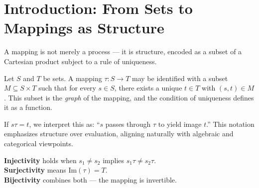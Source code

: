 \documentclass[10pt]{article}
\begin{document}
\section*{Introduction: From Sets to Mappings as Structure}

A mapping is not merely a process — it is structure, encoded as a subset of a Cartesian product subject to a rule of uniqueness.

Let \( S \) and \( T \) be sets. A mapping \( \tau : S \to T \) may be identified with a subset \( M \subseteq S \times T \) such that for every \( s \in S \), there exists a unique \( t \in T \) with \( (s, t) \in M \). This subset is the \emph{graph} of the mapping, and the condition of uniqueness defines it as a function.

If \( s \tau = t \), we interpret this as: “\( s \) passes through \( \tau \) to yield image \( t \).” This notation emphasizes structure over evaluation, aligning naturally with algebraic and categorical viewpoints.

\vspace{1em}

\textbf{Injectivity} holds when \( s_1 \neq s_2 \) implies \( s_1 \tau \neq s_2 \tau \). \\
\textbf{Surjectivity} means \( \text{Im}(\tau) = T \). \\
\textbf{Bijectivity} combines both — the mapping is invertible.
\end{document}
